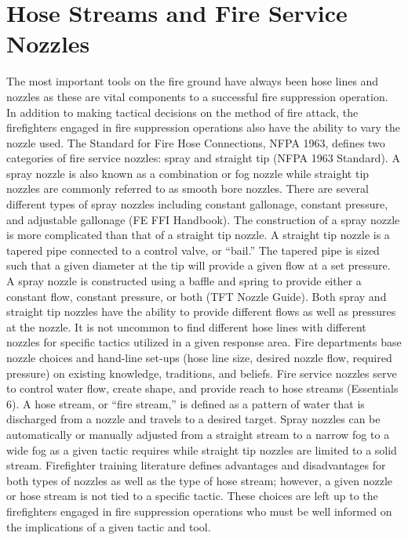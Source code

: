 \documentclass[12pt,oneside]{book}
\begin{document}
\section*{Hose Streams and Fire Service Nozzles}

The most important tools on the fire ground have always been hose lines and nozzles as these are vital components to a successful fire suppression operation. In addition to making tactical decisions on the method of fire attack, the firefighters engaged in fire suppression operations also have the ability to vary the nozzle used. The Standard for Fire Hose Connections, NFPA 1963, defines two categories of fire service nozzles: spray and straight tip (NFPA 1963 Standard). A spray nozzle is also known as a combination or fog nozzle while straight tip nozzles are commonly referred to as smooth bore nozzles. There are several different types of spray nozzles including constant gallonage, constant pressure, and adjustable gallonage (FE FFI Handbook). The construction of a spray nozzle is more complicated than that of a straight tip nozzle. A straight tip nozzle is a tapered pipe connected to a control valve, or ``bail.'' The tapered pipe is sized such that a given diameter at the tip will provide a given flow at a set pressure. A spray nozzle is constructed using a baffle and spring to provide either a constant flow, constant pressure, or both (TFT Nozzle Guide). Both spray and straight tip nozzles have the ability to provide different flows as well as pressures at the nozzle. It is not uncommon to find different hose lines with different nozzles for specific tactics utilized in a given response area. Fire departments base nozzle choices and hand-line set-ups (hose line size, desired nozzle flow, required pressure) on existing knowledge, traditions, and beliefs. Fire service nozzles serve to control water flow, create shape, and provide reach to hose streams (Essentials 6). A hose stream, or ``fire stream,'' is defined as a pattern of water that is discharged from a nozzle and travels to a desired target. Spray nozzles can be automatically or manually adjusted from a straight stream to a narrow fog to a wide fog as a given tactic requires while straight tip nozzles are limited to a solid stream. Firefighter training literature defines advantages and disadvantages for both types of nozzles as well as the type of hose stream; however, a given nozzle or hose stream is not tied to a specific tactic. These choices are left up to the firefighters engaged in fire suppression operations who must be well informed on the implications of a given tactic and tool.
\end{document}
